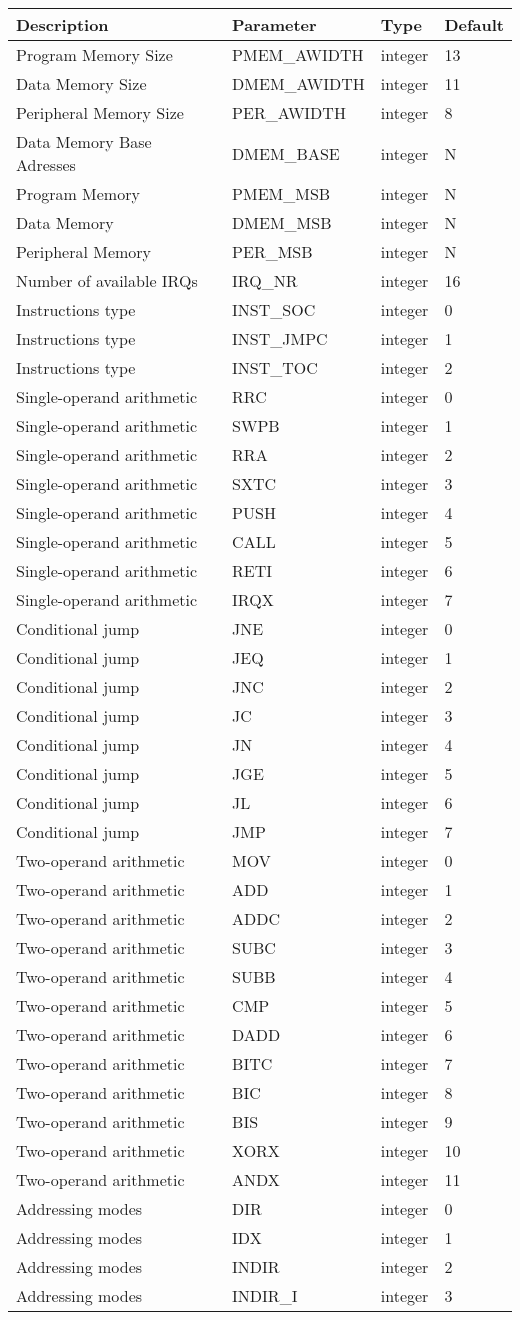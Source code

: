\documentclass[]{article}
\begin{document}
\begin{longtable}[]{@{}llll@{}}
\toprule
Description & Parameter & Type & Default\tabularnewline
\midrule
\endhead
Program Memory Size & PMEM\_AWIDTH & integer & 13\tabularnewline
Data Memory Size & DMEM\_AWIDTH & integer & 11\tabularnewline
Peripheral Memory Size & PER\_AWIDTH & integer & 8\tabularnewline
Data Memory Base Adresses & DMEM\_BASE & integer & N\tabularnewline
Program Memory & PMEM\_MSB & integer & N\tabularnewline
Data Memory & DMEM\_MSB & integer & N\tabularnewline
Peripheral Memory & PER\_MSB & integer & N\tabularnewline
Number of available IRQs & IRQ\_NR & integer & 16\tabularnewline
Instructions type & INST\_SOC & integer & 0\tabularnewline
Instructions type & INST\_JMPC & integer & 1\tabularnewline
Instructions type & INST\_TOC & integer & 2\tabularnewline
Single-operand arithmetic & RRC & integer & 0\tabularnewline
Single-operand arithmetic & SWPB & integer & 1\tabularnewline
Single-operand arithmetic & RRA & integer & 2\tabularnewline
Single-operand arithmetic & SXTC & integer & 3\tabularnewline
Single-operand arithmetic & PUSH & integer & 4\tabularnewline
Single-operand arithmetic & CALL & integer & 5\tabularnewline
Single-operand arithmetic & RETI & integer & 6\tabularnewline
Single-operand arithmetic & IRQX & integer & 7\tabularnewline
Conditional jump & JNE & integer & 0\tabularnewline
Conditional jump & JEQ & integer & 1\tabularnewline
Conditional jump & JNC & integer & 2\tabularnewline
Conditional jump & JC & integer & 3\tabularnewline
Conditional jump & JN & integer & 4\tabularnewline
Conditional jump & JGE & integer & 5\tabularnewline
Conditional jump & JL & integer & 6\tabularnewline
Conditional jump & JMP & integer & 7\tabularnewline
Two-operand arithmetic & MOV & integer & 0\tabularnewline
Two-operand arithmetic & ADD & integer & 1\tabularnewline
Two-operand arithmetic & ADDC & integer & 2\tabularnewline
Two-operand arithmetic & SUBC & integer & 3\tabularnewline
Two-operand arithmetic & SUBB & integer & 4\tabularnewline
Two-operand arithmetic & CMP & integer & 5\tabularnewline
Two-operand arithmetic & DADD & integer & 6\tabularnewline
Two-operand arithmetic & BITC & integer & 7\tabularnewline
Two-operand arithmetic & BIC & integer & 8\tabularnewline
Two-operand arithmetic & BIS & integer & 9\tabularnewline
Two-operand arithmetic & XORX & integer & 10\tabularnewline
Two-operand arithmetic & ANDX & integer & 11\tabularnewline
Addressing modes & DIR & integer & 0\tabularnewline
Addressing modes & IDX & integer & 1\tabularnewline
Addressing modes & INDIR & integer & 2\tabularnewline
Addressing modes & INDIR\_I & integer & 3\tabularnewline

\end{longtable}
\end{document}
